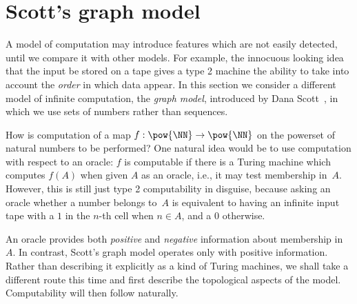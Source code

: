 \section{Scott's graph model}
\label{sec:graph-model}

A model of computation may introduce features which are not easily
detected, until we compare it with other models. For example, the
innocuous looking idea that the input be stored on a tape gives a type
2 machine the ability to take into account the \emph{order} in which
data appear. In this section we consider a different model of infinite
computation, the \emph{graph model}, introduced by Dana
Scott~, in which we use sets of numbers rather than
sequences.

How is computation of a map $f : \pow{\NN} \to \pow{\NN}$ on the
powerset of natural numbers to be performed? One
natural idea would be to use computation with respect to an oracle:
$f$ is computable if there is a Turing machine which computes $f(A)$
when given $A$ as an oracle, i.e., it may test membership in~$A$.
However, this is still just type 2 computability in disguise, because
asking an oracle whether a number belongs to~$A$ is equivalent to
having an infinite input tape with a $1$ in the $n$-th cell when $n
\in A$, and a $0$ otherwise.

An oracle provides both \emph{positive} and \emph{negative}
information about membership in~$A$. In contrast, Scott's graph model operates
only with positive information. Rather than describing it explicitly as a
kind of Turing machines, we shall take a different route this time and
first describe the topological aspects of the model. Computability
will then follow naturally.

